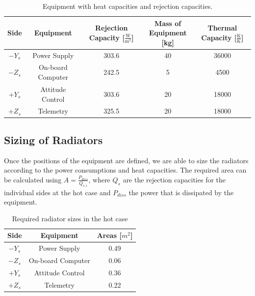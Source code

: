 \begin{table}[H]
\centering
\begin{tabular}{ | c| c|c|c|c|}
\hline 
Side & Equipment  & Rejection Capacity [$\frac{\mathrm{W}}{\mathrm{m}^{2}} $] & \specialcell{Mass of \\Equipment [kg]} & Thermal Capacity [$\frac{\mathrm{K}}{\mathrm{K}}$]   \\ \hline
$-Y_{s}$ & Power Supply & 303.6 & 40 &  36000   \\ \hline
$-Z_{s}$ &On-board Computer&  242.5 & 5 & 4500 \\\hline
$+Y_{s}$ &Attitude Control  &  303.6 & 20& 18000 \\ \hline
$+Z_{s}$ &Telemetry & 325.5 & 20 &  18000 \\ \hline
\end{tabular}
\caption{Equipment with heat capacities and rejection capacities.}
\label{tab:arrangement}
\end{table} 

\subsection{Sizing of Radiators}
Once  the positions of the equipment are defined, we are able to size the radiators according to the power consumptions and heat capacities. The required area can be calculated using $A=\frac{P_{diss}}{Q_{s,i}}$, where $Q_{s}$ are the rejection capacities for the individual sides at the hot case and $P_{diss}$ the power that is dissipated by the equipment.


\begin{table}[H]
\centering
\begin{tabular}{ | c| c| c| }
\hline 
Side & Equipment  & Areas [$m^{2}$] \\ \hline
$-Y_{s}$ & Power Supply & 0.49   \\ \hline
$-Z_{s}$ &On-board Computer & 0.06   \\\hline
$+Y_{s}$ &Attitude Control &  0.36 \\ \hline
$+Z_{s}$ &Telemetry  &    0.22 \\ \hline
\end{tabular}
\caption{Required radiator sizes in the hot case}
\label{tab:arrangement}
\end{table}

 
